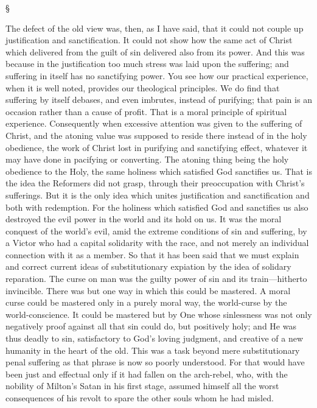 \documentclass[12pt,a5paper,twoside,titlepage]{book}
\begin{document}
\begin{center}
\S
\end{center}

The defect of the old view was, then, as I have 
said, that it could not couple up justification 
and sanctification. It could not show how the 
same act of Christ which delivered from the 
guilt of sin delivered also from its power. And 
this was because in the justification too much 
stress was laid upon the suffering; and suffering 
in itself has no sanctifying power. You see how 
our practical experience, when it is well noted, 
provides our theological principles. We do 
find that suffering by itself debases, and even 
imbrutes, instead of purifying; that pain is an 
occasion rather than a cause of profit. That is 
a moral principle of spiritual experience. Consequently 
when excessive attention was given to 
the suffering of Christ, and the atoning value 
was supposed to reside there instead of in the 
holy obedience, the work of Christ lost in purifying 
and sanctifying effect, whatever it may 
have done in pacifying or converting. The 
atoning thing being the holy obedience to the 
Holy, the same holiness which satisfied God 
sanctifies us. That is the idea the Reformers 
did not grasp, through their preoccupation 
with Christ's sufferings. But it is the only 
idea which unites justification and sanctification 
and both with redemption. For the holiness 
which satisfied God and sanctifies us also 
destroyed the evil power in the world and 
its hold on us. It was the moral conquest 
of the world's evil, amid the extreme conditions 
of sin and suffering, by a Victor who 
had a capital solidarity with the race, and not 
merely an individual connection with it as a 
member. So that it has been said that we 
must explain and correct current ideas of substitutionary 
expiation by the idea of solidary 
reparation. The curse on man was the guilty 
power of sin and its train---hitherto invincible. 
There was but one way in which this could be 
mastered. A moral curse could be mastered 
only in a purely moral way, the world-curse 
by the world-conscience. It could be mastered 
but by One whose sinlessness was not only 
negatively proof against all that sin could do, 
but positively holy; and He was thus deadly to 
sin, satisfactory to God's loving judgment, and 
creative of a new humanity in the heart of the 
old. This was a task beyond mere substitutionary 
penal suffering as that phrase is now so 
poorly understood. For that would have been 
just and effectual only if it had fallen on the 
arch-rebel, who, with the nobility of Milton's 
Satan in his first stage, assumed himself all the 
worst consequences of his revolt to spare the 
other souls whom he had misled. 
\end{document}
